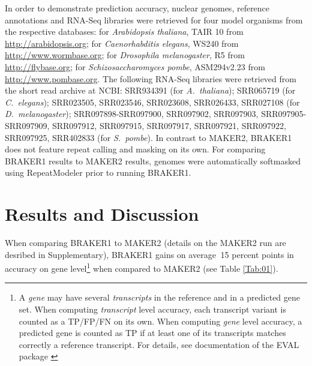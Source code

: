 \documentclass{bioinfo}
\begin{document}
\begin{methods}
In order to demonstrate prediction accuracy, nuclear genomes, reference annotations and RNA-Seq libraries were retrieved for four model organisms from the respective databases: for \textit{Arabidopsis thaliana}, TAIR 10 from \url{http://arabidopsis.org}; for \textit{Caenorhabditis elegans}, WS240 from \url{http://www.wormbase.org}; for \textit{Drosophila melanogaster}, R5 from \url{http://flybase.org}; for \textit{Schizosaccharomyces pombe}, ASM294v2.23 from \url{http://www.pombase.org}. The following RNA-Seq libraries were retrieved from the short read archive at NCBI: SRR934391 (for \textit{A.~thaliana}); SRR065719 (for \textit{C.~elegans}); SRR023505, SRR023546, SRR023608, SRR026433, SRR027108 (for \textit{D.~melanogaster}); SRR097898-SRR097900, SRR097902, SRR097903,
SRR097905-SRR097909, SRR097912, SRR097915, SRR097917, SRR097921, SRR097922, SRR097925, SRR402833 (for \textit{S.~pombe}). In contrast to MAKER2, BRAKER1 does not feature repeat calling and masking on its own. For comparing BRAKER1 results to MAKER2 results, genomes were automatically softmasked using RepeatModeler \citep{RepeatModeler} prior to running BRAKER1.

\end{methods}


\section{Results and Discussion}

When comparing BRAKER1 to MAKER2 (details on the MAKER2 run are desribed in Supplementary), BRAKER1 gains on average $~$15 percent points in accuracy on gene level\footnote{A \textit{gene} may have several \textit{transcripts} in the reference and in a predicted gene set. When computing \textit{transcript} level accuracy, each transcript variant is counted as a TP/FP/FN on its own. When computing \textit{gene} level accuracy, a predicted gene is counted as TP if at least one of its transcripts matches correctly a reference transcript. For details, see documentation of the EVAL package \citep{Eval}} when compared to MAKER2 (see Table \ref{Tab:01}).
\end{document}
